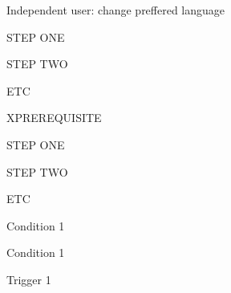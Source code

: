 

\begin{uc}{Independent user: change preffered language}

    \begin{uc-mss}
    \item STEP ONE
    \item STEP TWO
    \item ETC
    \end{uc-mss}

    \begin{uc-ext}

        \begin{uc-fail}{X}{PREREQUISITE}
        \item STEP ONE
        \item STEP TWO
        \item ETC
        \end{uc-fail}

    \end{uc-ext}

    \begin{uc-pre}
    \item Condition 1
    \end{uc-pre}

    \begin{uc-post}
    \item Condition 1
    \end{uc-post}

    \begin{uc-trig}
    \item Trigger 1
    \end{uc-trig}

\end{uc}